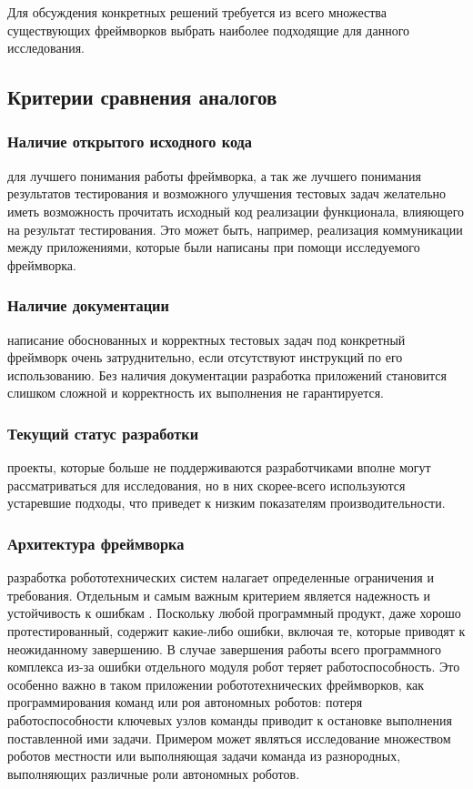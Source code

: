 Для обсуждения конкретных решений требуется из всего множества существующих фреймворков выбрать наиболее подходящие для данного исследования.

\subsection{Критерии сравнения аналогов} 

\subsubsection{Наличие открытого исходного кода} для лучшего понимания работы фреймворка, а так же лучшего понимания результатов тестирования и возможного улучшения тестовых задач желательно иметь возможность прочитать исходный код реализации функционала, влияющего на результат тестирования. Это может быть, например, реализация коммуникации между приложениями, которые были написаны при помощи исследуемого фреймворка.

\subsubsection{Наличие документации} написание обоснованных и корректных тестовых задач под конкретный фреймворк очень затруднительно, если отсутствуют инструкций по его использованию. Без наличия документации разработка приложений становится слишком сложной и корректность их выполнения не гарантируется.

\subsubsection{Текущий статус разработки} проекты, которые больше не поддерживаются разработчиками вполне могут рассматриваться для исследования, но в них скорее-всего используются устаревшие подходы, что приведет к низким показателям производительности.

\subsubsection{Архитектура фреймворка} разработка робототехнических систем налагает определенные ограничения и требования. Отдельным и самым важным критерием является надежность и устойчивость к ошибкам \cite{blasco2012multiagent}.  Поскольку любой программный продукт, даже хорошо протестированный, содержит какие-либо ошибки, включая те, которые приводят к неожиданному завершению. В случае завершения работы всего программного комплекса из-за ошибки отдельного модуля робот теряет работоспособность. Это особенно важно в таком приложении робототехнических фреймворков, как программирования команд или роя автономных роботов: потеря работоспособности ключевых узлов команды приводит к остановке выполнения поставленной ими задачи. Примером может являться исследование множеством роботов местности или выполняющая задачи команда из разнородных, выполняющих различные роли автономных роботов.

